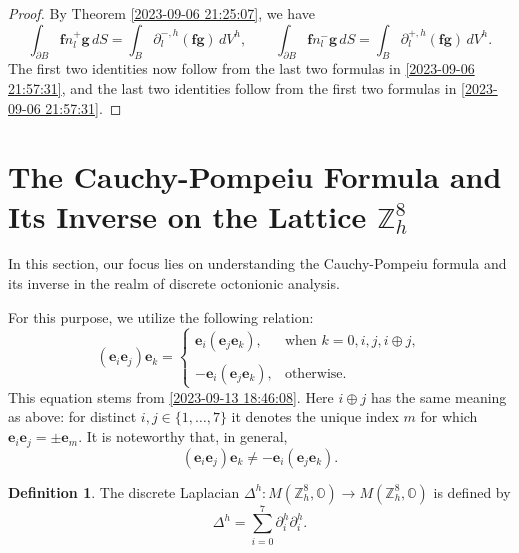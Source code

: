 \documentclass{amsart}
\theoremstyle{definition}
\newtheorem{definition}[theorem]{Definition}
\theoremstyle{remark}
\numberwithin{equation}{section}
\newcommand{\p}{\partial}
\newcommand{\OO}{\mathbb O}
\newcommand{\Z}{\mathbb Z}
\newcommand{\f}{\bm{f}}
\newcommand{\g}{\bm{g}}
\newcommand{\e}{\bm{e}}
\begin{document}
\begin{proof}
	By Theorem \ref{2023-09-06 21:25:07}, we have
	\begin{equation*}
		\int_{\p B} \f n_l^+ \g \, dS = \int_B \p_l^{-,h}(\f\g) \, dV^h,
		\qquad
		\int_{\p B} \f n_l^- \g \, dS = \int_B \p_l^{+,h}(\f\g) \, dV^h.
	\end{equation*}
	The first two identities now follow from the last two formulas in \eqref{2023-09-06 21:57:31}, and the last two identities follow from the first two formulas in \eqref{2023-09-06 21:57:31}.
\end{proof}




















\section[Cauchy-Pompeiu Formula on the 8D Lattice]{The Cauchy-Pompeiu Formula and Its Inverse on the Lattice \texorpdfstring{$\Z_h^8$}{Zh8}}

In this section, our focus lies on understanding the Cauchy-Pompeiu formula and its inverse in the realm of discrete octonionic analysis.


 For this purpose, we utilize the following relation:
\[
(\e_i\e_j)\e_k=\begin{cases}
	\e_i(\e_j\e_k),& \text{when } k=0,i,j,i\oplus j,\\\\
	-\e_i(\e_j\e_k),& \text{otherwise}.
\end{cases}
\]
This equation stems from \eqref{2023-09-13 18:46:08}. Here $i\oplus j$ has the same meaning as above: for distinct $i,j\in\{1,\dots,7\}$ it denotes the unique index $m$ for which $\e_i\e_j=\pm \e_m$.
  It is noteworthy that, in general,  
	\[
(\e_i\e_j)\e_k\neq -\e_i(\e_j\e_k).
\]
 
 


    \begin{definition}
        The discrete Laplacian $\Delta^h : M(\Z^8_h, \OO)\longrightarrow M(\Z^8_h, \OO)$ is defined by \[
\Delta^h  =  \sum\limits_{i=0}^7 \p_i^h\p_i^h .
\]
    \end{definition}
\end{document}
